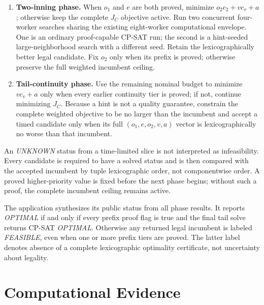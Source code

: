 \documentclass[11pt]{article}
\begin{document}
\begin{enumerate}
    test the $e=0$ slice inside the existing phase budget and otherwise
    minimize $e$ with the unspent remainder. A proved value is fixed. If
    $o_1$ remains unproved, do not independently cap $e$: retain the complete
    ceiling $J_C\leq J_C^{inc}$, where $J_C^{inc}$ is the accepted incumbent's
    integer objective value, so a later improvement in $o_1$ may
    legitimately spend lower-priority quality.
    \item \textbf{Two-inning phase.} When $o_1$ and $e$ are both proved,
    minimize $o_2c_2+vc_v+a$; otherwise keep the complete $J_C$ objective
    active. Run two concurrent four-worker searches sharing the existing
    eight-worker computational envelope. One is an ordinary proof-capable
    CP-SAT run; the second is a hint-seeded large-neighborhood search with a
    different seed. Retain the lexicographically better legal candidate. Fix
    $o_2$ only when its prefix is proved; otherwise preserve the full weighted
    incumbent ceiling.
    \item \textbf{Tail-continuity phase.} Use the remaining nominal budget to
    minimize $vc_v+a$ only when every earlier continuity tier is proved; if
    not, continue minimizing $J_C$. Because a hint is not a quality guarantee,
    constrain the complete weighted objective to be no larger than the
    incumbent and accept a timed candidate only when its full
    $(o_1,e,o_2,v,a)$ vector is lexicographically no worse than that incumbent.
\end{enumerate}

An \emph{UNKNOWN} status from a time-limited slice is not interpreted as
infeasibility. Every candidate is required to have a solved status and is then
compared with the accepted incumbent by tuple lexicographic order, not
componentwise order. A proved higher-priority value is fixed before the next
phase begins; without such a proof, the complete incumbent ceiling remains
active.

The application synthesizes its public status from all phase results. It reports
\emph{OPTIMAL} if and only if every prefix proof flag is true and the final tail
solve returns CP-SAT \emph{OPTIMAL}. Otherwise any returned legal incumbent is
labeled \emph{FEASIBLE}, even when one or more prefix tiers are proved. The
latter label denotes absence of a complete lexicographic optimality certificate,
not uncertainty about legality.

\section{Computational Evidence}
\end{document}
